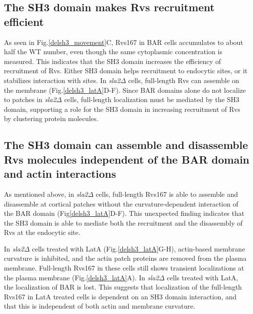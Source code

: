 \subsection{The SH3 domain makes Rvs recruitment efficient} 
As seen in Fig.\ref{delsh3_movement}C, Rvs167 in BAR cells accumulates to about half the WT number, even though the same cytoplasmic concentration is measured. This indicates that the SH3 domain increases the efficiency of recruitment of Rvs. Either SH3 domain helps recruitment to endocytic sites, or it stabilizes interaction with sites. In \textit{sla2$\Delta$}  cells, full-length Rvs can assemble on the membrane (Fig.\ref{delsh3_latA}D-F). Since BAR domains alone do not localize to patches in \textit{sla2$\Delta$}  cells, full-length localization must be mediated by the SH3 domain, supporting a role for the SH3 domain in increasing recruitment of Rvs by clustering protein molecules. 


\subsection{The SH3 domain can assemble and disassemble Rvs molecules independent of the BAR domain and actin interactions} 
As mentioned above, in \textit{sla2$\Delta$}  cells, full-length Rvs167 is able to assemble and disassemble at cortical patches without the curvature-dependent interaction of the BAR domain (Fig\ref{delsh3_latA}D-F). This unexpected finding indicates that the SH3 domain is able to mediate both the recruitment and the disassembly of Rvs at the endocytic site. 


	\vspace{5mm}
In \textit{sla2$\Delta$}  cells treated with LatA (Fig.\ref{delsh3_latA}G-H), actin-based membrane curvature is inhibited, and the actin patch proteins are removed from the plasma membrane. Full-length Rvs167 in these cells still shows transient localizations at the plasma membrane (Fig.\ref{delsh3_latA}A). In \textit{sla2$\Delta$}  cells treated with LatA, the localization of BAR is lost. This suggests that localization of the full-length Rvs167 in LatA treated cells is dependent on an SH3 domain interaction, and that this is independent of both actin and membrane curvature. 



